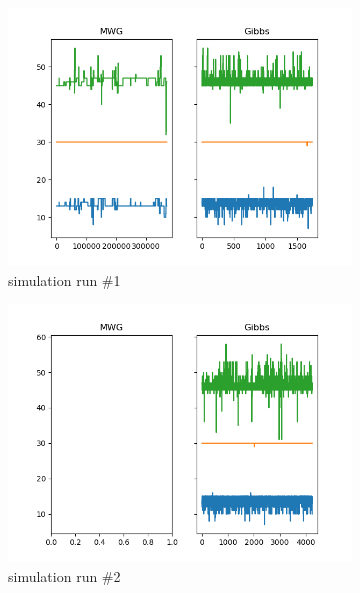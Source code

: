 \begin{figure}[H]
    \centering
    \begin{subfigure}{.3\textwidth}
    	\centering
        \includegraphics[width=\linewidth]{../../plots/Trace_post_burnin_M4_N60_NMCMC3_seed0_diffind2.png}
        \caption{simulation run \#1}
    \end{subfigure}
    \begin{subfigure}{.3\textwidth}
        \centering
    	\includegraphics[width=\linewidth]{../../plots/Trace_post_burnin_M4_N60_NMCMC3_seed1_diffind2.png}
    	\caption{simulation run \#2}
	\end{subfigure}
	\begin{subfigure}{.3\textwidth}
	    \centering

\end{subfigure}
\end{figure}
